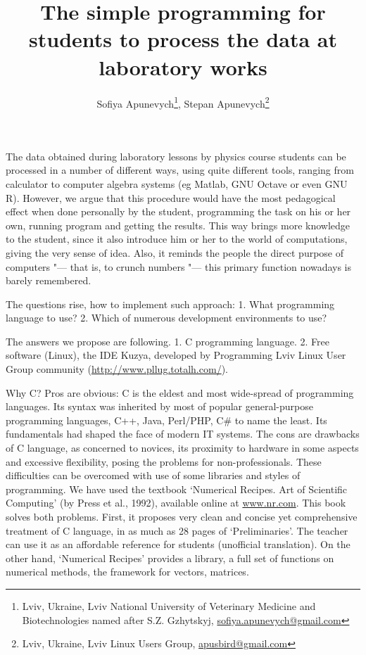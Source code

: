 \documentclass[10pt, a5paper]{article}
\begin{document}
\title{The simple programming for students to process the data at laboratory works}
\author{Sofiya Apunevych\footnote{Lviv, Ukraine, Lviv National University of Veterinary Medicine and Biotechnologies named after S.Z. Gzhytskyj, \url{sofiya.apunevych@gmail.com}}, Stepan Apunevych\footnote{Lviv, Ukraine, Lviv Linux Users Group, \url{apusbird@gmail.com}}}
\date{}
\maketitle

The data obtained during laboratory lessons by physics course stu\-dents can be processed in a number of different ways, using quite different tools, ranging from calculator to computer algebra systems (eg Matlab, GNU Octave or even GNU R). However, we argue that this procedure would have the most pedagogical effect when done \linebreak personally by the student, programming the task on his or her own, running program and getting the results. This way brings more know\-ledge to the student, since it also introduce him or her to the world of computations, giving the very sense of idea. Also, it reminds the people the direct purpose of computers "--- that is, to crunch numbers "--- this primary function nowadays is barely remembered.

The questions rise, how to implement such approach: 1. What \linebreak programming language to use? 2. Which of numerous development environments to use?

The answers we propose are following. 1. C programming language. 2. Free software (Linux), the IDE Kuzya, developed by Programming Lviv Linux User Group community (\url{http://www.pllug.totalh.com/}). 

Why C? Pros are obvious: C is the eldest and most wide-spread of programming languages. Its syntax was inherited by most of popular general-purpose programming languages, C++, Java, Perl/PHP, C\#  to name the least. Its fundamentals had shaped the face of modern IT systems. The cons are drawbacks of C language, as concerned to novices, its proximity to hardware in some aspects and excessive \linebreak  flexibility, posing the problems for non-professionals. These difficulties can be overcomed with use of some libraries and styles of programming. We have used the textbook `Numerical Recipes. Art of Scientific Compu\-ting' (by Press et al., 1992), available online at \url{www.nr.com}. This book solves both problems. First, it proposes very clean and  concise yet comprehensive treatment of C language, in as much as 28 pages of `Preliminaries'. The teacher can use it as an affordable reference for students (unofficial translation). On the other hand, `Numerical Recipes' provides a library, a full set of functions on numerical methods, the framework for vectors, matrices.
\end{document}
